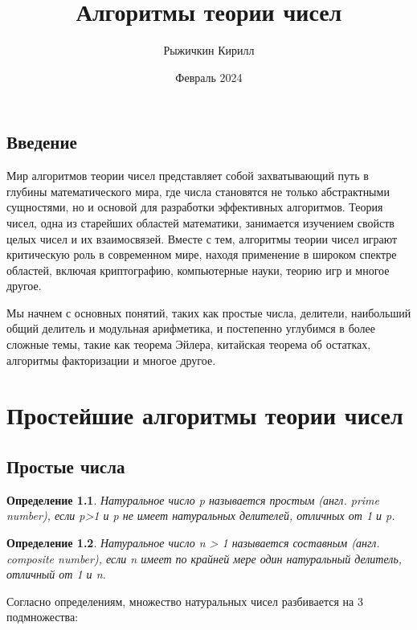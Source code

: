 \documentclass[12pt, a4paper, openany]{book}
\title{Алгоритмы теории чисел}
\author{Рыжичкин Кирилл}
\date{Февраль 2024}
\newtheorem*{definition}{Определение}
\begin{document}
\maketitle
\lstset{language=C++}

\tableofcontents

\newpage
\section*{Введение}

    Мир алгоритмов теории чисел представляет собой захватывающий путь в глубины математического мира, где числа становятся не только абстрактными сущностями, но и основой для разработки эффективных алгоритмов. Теория чисел, одна из старейших областей математики, занимается изучением свойств целых чисел и их взаимосвязей. Вместе с тем, алгоритмы теории чисел играют критическую роль в современном мире, находя применение в широком спектре областей, включая криптографию, компьютерные науки, теорию игр и многое другое.
    
    Мы начнем с основных понятий, таких как простые числа, делители, наибольший общий делитель и модульная арифметика, и постепенно углубимся в более сложные темы, такие как теорема Эйлера, китайская теорема об остатках, алгоритмы факторизации и многое другое.

\chapter[Простейшие алгоритмы теории чисел]{Простейшие алгоритмы теории чисел}
\section{Простые числа}

\begin{definition}
    Натуральное число p называется простым (англ. prime number), если p>1 и p не имеет натуральных делителей, отличных от 1 и p.
\end{definition}

\begin{definition}
    Натуральное число n > 1 называется составным (англ. composite number), если n имеет по крайней мере один натуральный делитель, отличный от 1 и n.
\end{definition}

\noindent
    Согласно определениям, множество натуральных чисел разбивается на 3 подмножества:
\end{document}
